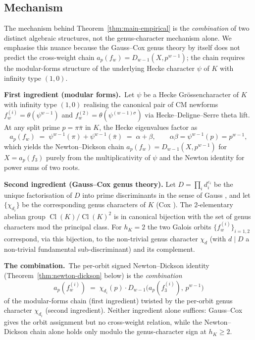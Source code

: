 \documentclass[11pt,a4paper]{amsart}
\theoremstyle{plain}
\theoremstyle{definition}
\DeclareMathOperator{\Cl}{Cl}
\begin{document}
\subsection{Mechanism}\label{ss:intro-mech}

The mechanism behind Theorem~\ref{thm:main-empirical} is the
\emph{combination} of two distinct algebraic structures, not the
genus-character mechanism alone. We emphasise this nuance because the
Gauss--Cox genus theory by itself does not predict the cross-weight
chain $a_p(f_w) = D_{w-1}(X, p^{w-1})$; the chain requires the modular-forms
structure of the underlying Hecke character $\psi$ of $K$ with infinity
type $(1, 0)$.

\smallskip\noindent\textbf{First ingredient (modular forms).}~Let
$\psi$ be a Hecke Gr\"ossencharacter of $K$ with infinity type $(1, 0)$
realising the canonical pair of CM newforms $f_w^{(i)} = \theta(\psi^{w-1})$
and $f_w^{(2)} = \theta(\psi^{(w-1)\sigma})$ via Hecke--Deligne--Serre
theta lift. At any split prime $p = \pi\bar\pi$ in $K$, the Hecke
eigenvalues factor as
\[
  a_p(f_w) \;=\; \psi^{w-1}(\pi) + \psi^{w-1}(\bar\pi) \;=\;
  \alpha + \beta,
  \qquad \alpha\beta = \psi^{w-1}(p) = p^{w-1},
\]
which yields the Newton--Dickson chain
$a_p(f_w) = D_{w-1}(X, p^{w-1})$ for $X = a_p(f_3)$ purely from the
multiplicativity of $\psi$ and the Newton identity for power sums of
two roots.

\smallskip\noindent\textbf{Second ingredient (Gauss--Cox genus theory).}
Let $D = \prod_{i} d_i^{\varepsilon_i}$ be the unique
factorisation of $D$ into prime discriminants in the sense of Gauss
\cite[Disquisitiones \S225--237]{Gauss1801}, and let $\{\chi_{d_i}\}$ be the
corresponding genus characters of $K$ (Cox \cite[Thm.~6.1]{Cox1989}). The
$2$-elementary abelian group $\Cl(K)/\Cl(K)^2$ is in canonical bijection with
the set of genus characters mod the principal class. For $h_K = 2$ the two
Galois orbits $\{f_w^{(i)}\}_{i=1,2}$ correspond, via this bijection, to the
non-trivial genus character $\chi_{d}$ (with $d \mid D$ a non-trivial
fundamental sub-discriminant) and its complement.

\smallskip\noindent\textbf{The combination.}~The per-orbit signed
Newton--Dickson identity (Theorem~\ref{thm:newton-dickson} below) is the
\emph{combination}
\[
   a_p(f_w^{(i)}) \;=\; \chi_{d_i}(p) \cdot D_{w-1}\!\bigl(a_p(f_3^{(i)}),\,p^{w-1}\bigr)
\]
of the modular-forms chain (first ingredient) twisted by the per-orbit
genus character $\chi_{d_i}$ (second ingredient). Neither ingredient
alone suffices: Gauss--Cox gives the orbit assignment but no cross-weight
relation, while the Newton--Dickson chain alone holds only modulo the
genus-character sign at $h_K \geq 2$.
\end{document}
